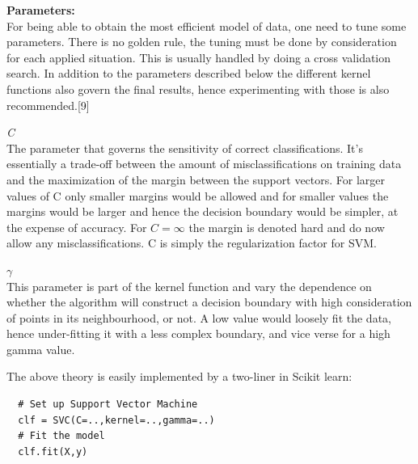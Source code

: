 \textbf{Parameters:}\\
For being able to obtain the most efficient model of data, one need to tune some parameters. There is no golden rule, the tuning must be done by consideration for each applied situation. This is usually handled by doing a cross validation search. In addition to the parameters described below the different kernel functions also govern the final results, hence experimenting with those is also recommended.[9]
\\
\par
\textit{C}\\
The parameter that governs the sensitivity of correct classifications. It's essentially a trade-off between the amount of misclassifications on training data and the maximization of the margin between the support vectors. For larger values of C only smaller margins would be allowed and for smaller values the margins would be larger and hence the decision boundary would be simpler, at the expense of accuracy. For $C = \infty$ the margin is denoted hard and do now allow any misclassifications. C is simply the regularization factor for SVM. 
\\
\par
$\gamma$\\
This parameter is part of the kernel function and vary the dependence on whether the algorithm will construct a decision boundary with high consideration of points in its neighbourhood, or not. A low value would loosely fit the data, hence under-fitting it with a less complex boundary, and vice verse for a high gamma value.
\\
\par

The above theory is easily implemented by a two-liner in Scikit learn:

\begin{verbatim}
  # Set up Support Vector Machine
  clf = SVC(C=..,kernel=..,gamma=..)
  # Fit the model
  clf.fit(X,y)
\end{verbatim}